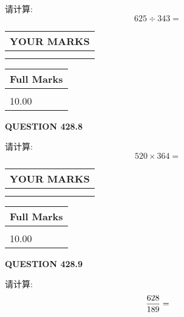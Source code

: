 \documentclass{ctexart}
\begin{document}
  
 
请计算:
\begin{equation}
625  \div    %
343 = \nonumber
\end{equation}
 

 

 
  
\vspace{0.2in}
  
\noindent\begin{tabular}{|l|}
\hline
 YOUR MARKS  \\
\hline
 \\ 
 \\ 
\hline
\end{tabular}
\hspace{0.05in} \begin{tabular}{|l|}
\hline
 Full Marks  \\
\hline
 \\ 
10.00 \\
\hline
\end{tabular}
{\textbf{\Large{QUESTION
428.8 
}}}
  
  
 
请计算:
\begin{equation}
520  \times    %
364 = \nonumber
\end{equation}
 

 

 
  
\vspace{0.2in}
  
\noindent\begin{tabular}{|l|}
\hline
 YOUR MARKS  \\
\hline
 \\ 
 \\ 
\hline
\end{tabular}
\hspace{0.05in} \begin{tabular}{|l|}
\hline
 Full Marks  \\
\hline
 \\ 
10.00 \\
\hline
\end{tabular}
{\textbf{\Large{QUESTION
428.9 
}}}
  
  
 
请计算:
\begin{equation}
\frac { %
628 }  {  %
189} = \nonumber
\end{equation}
 

 
\end{document}
